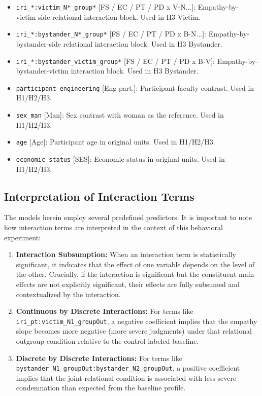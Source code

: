 \documentclass[11pt]{article}
\begin{document}
\begin{itemize}
  \item \texttt{iri\_*:victim\_N*\_group*} [FS / EC / PT / PD x V-N...]: Empathy-by-victim-side relational interaction block. Used in H3 Victim.
  \item \texttt{iri\_*:bystander\_N*\_group*} [FS / EC / PT / PD x B-N...]: Empathy-by-bystander-side relational interaction block. Used in H3 Bystander.
  \item \texttt{iri\_*:bystander\_victim\_group*} [FS / EC / PT / PD x B-V]: Empathy-by-bystander-victim interaction block. Used in H3 Bystander.
  \item \texttt{participant\_engineering} [Eng part.]: Participant faculty contrast. Used in H1/H2/H3.
  \item \texttt{sex\_man} [Man]: Sex contrast with woman as the reference. Used in H1/H2/H3.
  \item \texttt{age} [Age]: Participant age in original units. Used in H1/H2/H3.
  \item \texttt{economic\_status} [SES]: Economic status in original units. Used in H1/H2/H3.
\end{itemize}

\subsection{Interpretation of Interaction Terms}
The models herein employ several predefined predictors. It is important to note how interaction terms are interpreted in the context of this behavioral experiment:
\begin{enumerate}
  \item \textbf{Interaction Subsumption:} When an interaction term is statistically significant, it indicates that the effect of one variable depends on the level of the other. Crucially, if the interaction is significant but the constituent main effects are not explicitly significant, their effects are fully subsumed and contextualized by the interaction.
  \item \textbf{Continuous by Discrete Interactions:} For terms like \texttt{iri\_pt:victim\_N1\_groupOut}, a negative coefficient implies that the empathy slope becomes more negative (more severe judgments) under that relational outgroup condition relative to the control-labeled baseline.
  \item \textbf{Discrete by Discrete Interactions:} For terms like \texttt{bystander\_N1\_groupOut:bystander\_N2\_groupOut}, a positive coefficient implies that the joint relational condition is associated with less severe condemnation than expected from the baseline profile.
\end{enumerate}
\end{document}

